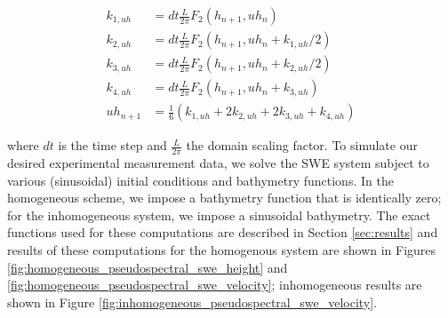 \begin{align*}
    k_{1,uh} &= dt\frac{L}{2\pi}F_2(h_{n+1}, uh_n)\\
    k_{2,uh} &= dt\frac{L}{2\pi}F_2(h_{n+1}, uh_n + k_{1,uh}/2)\\
    k_{3,uh} &= dt\frac{L}{2\pi}F_2(h_{n+1}, uh_n + k_{2,uh}/2)\\
    k_{4,uh} &= dt\frac{L}{2\pi}F_2(h_{n+1}, uh_n + k_{3,uh})\\
    uh_{n+1} &= \frac{1}{6}(k_{1,uh} + 2k_{2,uh} + 2k_{3,uh} + k_{4,uh})
\end{align*}

where $dt$ is the time step and $\frac{L}{2\pi}$ the domain scaling factor. To simulate our desired experimental 
measurement data, we solve the SWE system subject to various (sinusoidal) initial conditions and bathymetry functions. 
In the homogeneous scheme, we impose a bathymetry function that is identically zero; for the inhomogeneous system, we
impose a sinusoidal bathymetry. The exact functions used for these computations are described in Section 
\ref{sec:results} and results of these computations for the homogenous system are shown in Figures 
\ref{fig:homogeneous_pseudospectral_swe_height} and \ref{fig:homogeneous_pseudospectral_swe_velocity}; inhomogeneous 
results are shown in Figure \ref{fig:inhomogeneous_pseudospectral_swe_velocity}.